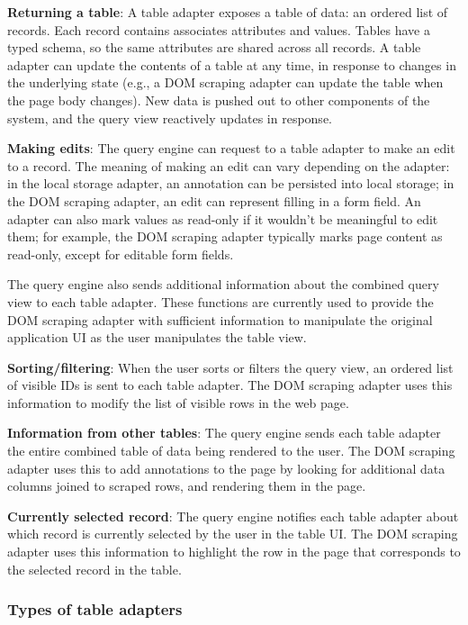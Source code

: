 \documentclass[sigplan,10pt,anonymous,review]{acmart}
\begin{document}
\textbf{Returning a table}: A table adapter exposes a table of data: an
ordered list of records. Each record contains associates attributes and
values. Tables have a typed schema, so the same attributes are shared
across all records. A table adapter can update the contents of a table
at any time, in response to changes in the underlying state (e.g., a DOM
scraping adapter can update the table when the page body changes). New
data is pushed out to other components of the system, and the query view
reactively updates in response.

\textbf{Making edits}: The query engine can request to a table adapter
to make an edit to a record. The meaning of making an edit can vary
depending on the adapter: in the local storage adapter, an annotation
can be persisted into local storage; in the DOM scraping adapter, an
edit can represent filling in a form field. An adapter can also mark
values as read-only if it wouldn't be meaningful to edit them; for
example, the DOM scraping adapter typically marks page content as
read-only, except for editable form fields.

The query engine also sends additional information about the combined
query view to each table adapter. These functions are currently used to
provide the DOM scraping adapter with sufficient information to
manipulate the original application UI as the user manipulates the table
view.

\textbf{Sorting/filtering}: When the user sorts or filters the query
view, an ordered list of visible IDs is sent to each table adapter. The
DOM scraping adapter uses this information to modify the list of visible
rows in the web page.

\textbf{Information from other tables}: The query engine sends each
table adapter the entire combined table of data being rendered to the
user. The DOM scraping adapter uses this to add annotations to the page
by looking for additional data columns joined to scraped rows, and
rendering them in the page.

\textbf{Currently selected record}: The query engine notifies each table
adapter about which record is currently selected by the user in the
table UI. The DOM scraping adapter uses this information to highlight
the row in the page that corresponds to the selected record in the
table.

\hypertarget{types-of-table-adapters}{%
\subsubsection{Types of table adapters}\label{types-of-table-adapters}}
\end{document}
